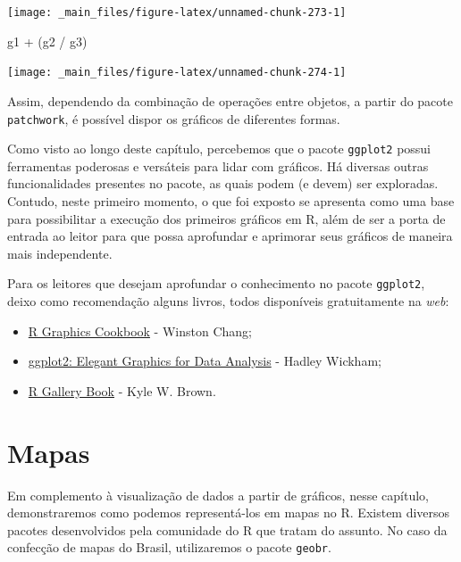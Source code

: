 \documentclass[
  brazilian,
]{book}
\newenvironment{Shaded}{\begin{snugshade}}{\end{snugshade}}
\newcommand{\NormalTok}[1]{#1}
\newcommand{\SpecialCharTok}[1]{\textcolor[rgb]{0.00,0.00,0.00}{#1}}
\begin{document}
\begin{center}\texttt{[image: \_main\_files/figure-latex/unnamed-chunk-273-1]} \end{center}

\begin{Shaded}
\begin{Highlighting}[]
\NormalTok{g1 }\SpecialCharTok{+}\NormalTok{ (g2 }\SpecialCharTok{/}\NormalTok{ g3)}
\end{Highlighting}
\end{Shaded}

\begin{center}\texttt{[image: \_main\_files/figure-latex/unnamed-chunk-274-1]} \end{center}

Assim, dependendo da combinação de operações entre objetos, a partir do pacote \texttt{patchwork}, é possível dispor os gráficos de diferentes formas.

Como visto ao longo deste capítulo, percebemos que o pacote \texttt{ggplot2} possui ferramentas poderosas e versáteis para lidar com gráficos. Há diversas outras funcionalidades presentes no pacote, as quais podem (e devem) ser exploradas. Contudo, neste primeiro momento, o que foi exposto se apresenta como uma base para possibilitar a execução dos primeiros gráficos em R, além de ser a porta de entrada ao leitor para que possa aprofundar e aprimorar seus gráficos de maneira mais independente.

Para os leitores que desejam aprofundar o conhecimento no pacote \texttt{ggplot2}, deixo como recomendação alguns livros, todos disponíveis gratuitamente na \emph{web}:

\begin{itemize}
\item
  \href{https://r-graphics.org/}{R Graphics Cookbook} - Winston Chang;
\item
  \href{https://ggplot2-book.org/}{ggplot2: Elegant Graphics for Data Analysis} - Hadley Wickham;
\item
  \href{https://bookdown.org/content/b298e479-b1ab-49fa-b83d-a57c2b034d49/}{R Gallery Book} - Kyle W. Brown.
\end{itemize}

\hypertarget{mapas}{%
\chapter{Mapas}\label{mapas}}

Em complemento à visualização de dados a partir de gráficos, nesse capítulo, demonstraremos como podemos representá-los em mapas no R. Existem diversos pacotes desenvolvidos pela comunidade do R que tratam do assunto. No caso da confecção de mapas do Brasil, utilizaremos o pacote \texttt{geobr}.
\end{document}
